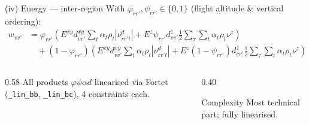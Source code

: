 \documentclass[aspectratio=169,10pt]{beamer}
\begin{document}
\begin{frame}{(iv) Energy — inter-region}
  {\small With $\varphi_{rr'},\psi_{rr'}\in\{0,1\}$ (flight altitude \& vertical ordering):}
  {\footnotesize
  \begin{equation*}
    \begin{aligned}
      w_{vv'}&=\varphi_{rr'}\!\left(E^{xy}d_{vv'}^{xy}\!\sum_t\!\alpha_t\rho_t|\nu_{rr't}^d|+E^{z}\psi_{rr'}d_{vv'}^{z}\tfrac12\!\sum_\tau\!\sum_t\!\alpha_t\rho_t\nu^{z}\right)\\
      &\quad+(1-\varphi_{rr'})\!\left(E^{xy}d_{vv'}^{xy}\!\sum_t\!\alpha_t\rho_t|\nu_{rr't}^d|+E^{z}(1-\psi_{rr'})d_{vv'}^{z}\tfrac12\!\sum_\tau\!\sum_t\!\alpha_t\rho_t\nu^{z}\right)
    \end{aligned}
    \tag*{$w$-C$_3$}
  \end{equation*}}
  \vspace{0.08cm}
  \begin{columns}[T,onlytextwidth]
    \begin{column}{0.58\textwidth}
      {\scriptsize All products $\varphi\psi\alpha d$ linearised via Fortet (\texttt{\_lin\_bb}, \texttt{\_lin\_bc}), 4 constraints each.}
    \end{column}
    \begin{column}{0.40\textwidth}
      \begin{alertblock}{Complexity}
        {\scriptsize Most technical part; fully linearised.}
      \end{alertblock}
    \end{column}
  \end{columns}
\end{frame}
\end{document}
